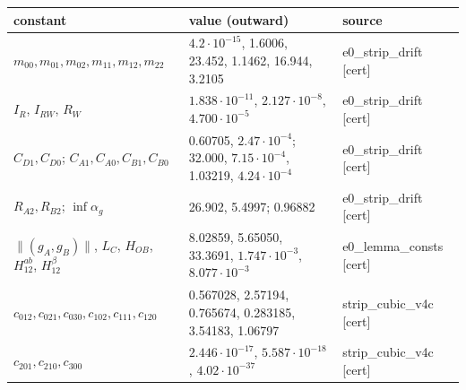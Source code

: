 \documentclass[10pt]{article}
\begin{document}
\begin{center}\small
\begin{tabular}{lll}\toprule
constant & value (outward) & source \\ \midrule
$m_{00},m_{01},m_{02},m_{11},m_{12},m_{22}$ & $4.2\cdot10^{-15}$, 1.6006, 23.452, 1.1462, 16.944, 3.2105 & e0\_strip\_drift [cert] \\
$I_R$, $I_{RW}$, $R_W$ & $1.838\cdot10^{-11}$, $2.127\cdot10^{-8}$, $4.700\cdot10^{-5}$ & e0\_strip\_drift [cert] \\
$C_{D1},C_{D0}$; $C_{A1},C_{A0},C_{B1},C_{B0}$ & 0.60705, $2.47\cdot10^{-4}$; 32.000, $7.15\cdot10^{-4}$, 1.03219, $4.24\cdot10^{-4}$ & e0\_strip\_drift [cert] \\
$R_{A2},R_{B2}$; $\inf\alpha_g$ & 26.902, 5.4997; 0.96882 & e0\_strip\_drift [cert] \\
$\|(g_A,g_B)\|$, $L_C$, $H_{OB}$, $H^{ab}_{12}$, $H^\beta_{12}$ & 8.02859, 5.65050, 33.3691, $1.747\cdot10^{-3}$, $8.077\cdot10^{-3}$ & e0\_lemma\_consts [cert] \\
$c_{012},c_{021},c_{030},c_{102},c_{111},c_{120}$ & 0.567028, 2.57194, 0.765674, 0.283185, 3.54183, 1.06797 & strip\_cubic\_v4c [cert] \\
$c_{201},c_{210},c_{300}$ & $2.446\cdot10^{-17}$, $5.587\cdot10^{-18}$, $4.02\cdot10^{-37}$ & strip\_cubic\_v4c [cert] \\
\bottomrule\end{tabular}\end{center}
\end{document}
